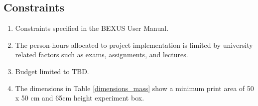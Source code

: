 \subsection{Constraints}

\begin{enumerate}[label=C.\arabic*]
    \item Constraints specified in the BEXUS User Manual.
    \item The person-hours allocated to project implementation is limited by university related factors such as exams, assignments, and lectures.
    \item Budget limited to TBD.
    \item The dimensions in Table \ref{dimensions_mass} show a minimum print area of 50 x 50 cm and 65cm height experiment box.
\end{enumerate}